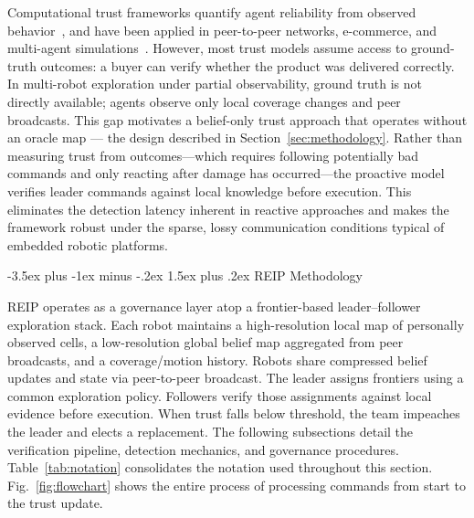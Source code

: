 \documentclass[conference]{IEEEtran}
\makeatletter
\renewcommand{\section}{\@startsection{section}{1}{\z@}%
  {-3.5ex plus -1ex minus -.2ex}%
  {1.5ex plus .2ex}%
  {\normalfont\large\bfseries\centering}}
\makeatother
\begin{document}
Computational trust frameworks quantify agent reliability from observed behavior~\cite{marsh1994formalising}, and have been applied in peer-to-peer networks, e-commerce, and multi-agent simulations~\cite{ramchurn2004trust}. However, most trust models assume access to ground-truth outcomes: a buyer can verify whether the product was delivered correctly. In multi-robot exploration under partial observability, ground truth is not directly available; agents observe only local coverage changes and peer broadcasts. This gap motivates a belief-only trust approach that operates without an oracle map --- the design described in Section~\ref{sec:methodology}. Rather than measuring trust from outcomes---which requires following potentially bad commands and only reacting after damage has occurred---the proactive model verifies leader commands against local knowledge before execution. This eliminates the detection latency inherent in reactive approaches and makes the framework robust under the sparse, lossy communication conditions typical of embedded robotic platforms.



\section{REIP Methodology}
\label{sec:methodology}

REIP operates as a governance layer atop a frontier-based leader--follower exploration stack. Each robot maintains a high-resolution local map of personally observed cells, a low-resolution global belief map aggregated from peer broadcasts, and a coverage/motion history. Robots share compressed belief updates and state via peer-to-peer broadcast. The leader assigns frontiers using a common exploration policy. Followers verify those assignments against local evidence before execution. When trust falls below threshold, the team impeaches the leader and elects a replacement. The following subsections detail the verification pipeline, detection mechanics, and governance procedures. Table~\ref{tab:notation} consolidates the notation used throughout this section. Fig.~\ref{fig:flowchart} shows the entire process of processing commands from start to the trust update.
\end{document}
